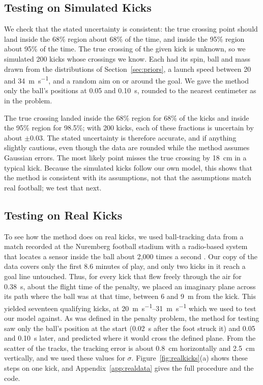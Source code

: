 \documentclass[10pt,a4paper]{article}
\begin{document}
\subsection{Testing on Simulated Kicks}
\label{sec:validation}

We check that the stated uncertainty is consistent: the true crossing point
should land inside the 68\% region about 68\% of the time, and inside the
95\% region about 95\% of the time. The true crossing of the given kick is
unknown, so we simulated 200 kicks whose crossings we know. Each had its
spin, ball and mass drawn from the distributions of
Section~\ref{sec:priors}, a launch speed between \SI{20}{} and
\SI{34}{\metre\per\second}, and a random aim on or around the goal. We gave
the method only the ball's positions at \SI{0.05}{} and \SI{0.10}{\second},
rounded to the nearest centimeter as in the problem.


The true crossing landed inside the 68\% region for 68\% of the kicks and
inside the 95\% region for 98.5\%; with 200 kicks, each of these fractions
is uncertain by about $\pm 0.03$. The stated uncertainty is therefore
accurate, and if anything slightly cautious, even though the data are
rounded while the method assumes Gaussian errors. The most likely point
misses the true crossing by \SI{18}{\centi\metre} in a typical kick. Because the simulated kicks
follow our own model, this shows that the method is consistent with its
assumptions, not that the assumptions match real football; we test that
next.

\subsection{Testing on Real Kicks}
\label{sec:realdata}

To see how the method does on real kicks, we used ball-tracking data from a
match recorded at the Nuremberg football stadium with a radio-based system
that locates a sensor inside the ball about 2{,}000 times a second
\citep{debs2013}. Our copy of the data covers only the first 8.6 minutes of
play, and only two kicks in it reach a goal line untouched. Thus, for every kick that flew freely through the air
for \SI{0.38}{\second}, about the flight time of the penalty, we placed an
imaginary plane across its path where the ball was at that time, between
\SI{6}{} and \SI{9}{\metre} from the kick. This yielded seventeen qualifying kicks, at
\SIrange{20}{31}{\metre\per\second} which we used to test our model against. As was defined in the penalty problem, the method for testing saw only
the ball's position at the start (\SI{0.02}{\second} after the foot struck
it) and \SI{0.05}{} and \SI{0.10}{\second} later, and predicted where it
would cross the defined plane. From the scatter of the tracks, the tracking error is
about \SI{0.8}{\centi\metre} horizontally and \SI{2.5}{\centi\metre}
vertically, and we used these values for $\sigma$. Figure~\ref{fig:realkicks}(a)
shows these steps on one kick, and Appendix~\ref{app:realdata} gives the full
procedure and the code.
\end{document}
